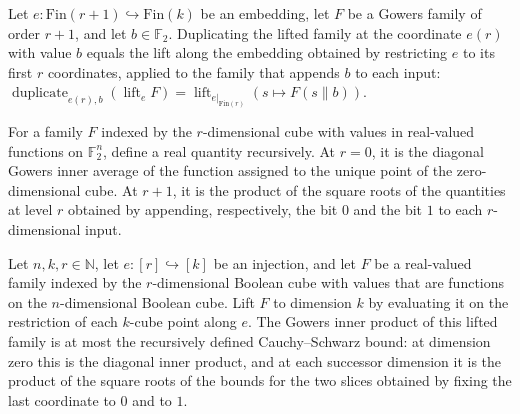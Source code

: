 \begin{theorem}
\label{FABL.gowersDuplicateAt_liftFamilyAlong}
\leanok
{}
Let $e:\mathrm{Fin}(r+1)\hookrightarrow\mathrm{Fin}(k)$ be an embedding, let $F$ be a
Gowers family of order $r+1$, and let $b\in\mathbb F_2$. Duplicating the lifted family
at the coordinate $e(r)$ with value $b$ equals the lift along the embedding obtained by
restricting $e$ to its first $r$ coordinates, applied to the family that appends $b$ to
each input: $\operatorname{duplicate}_{e(r),b}(\operatorname{lift}_e
F)=\operatorname{lift}_{e|_{\mathrm{Fin}(r)}}(s\mapsto F(s\mathbin{\|}b))$.
\end{theorem}

\begin{definition}
\label{FABL.gowersCSBound}
\leanok
{}
For a family $F$ indexed by the $r$-dimensional cube with values in real-valued
functions on $\mathbb F_2^n$, define a real quantity recursively. At $r=0$, it is the
diagonal Gowers inner average of the function assigned to the unique point of the
zero-dimensional cube. At $r+1$, it is the product of the square roots of the quantities
at level $r$ obtained by appending, respectively, the bit $0$ and the bit $1$ to each
$r$-dimensional input.
\end{definition}

\begin{theorem}
\label{FABL.gowersInner_liftFamilyAlong_le_csBound}
\leanok
{}
Let $n,k,r\in\mathbb N$, let $e:[r]\hookrightarrow[k]$ be an injection, and let $F$ be a
real-valued family indexed by the $r$-dimensional Boolean cube with values that are
functions on the $n$-dimensional Boolean cube. Lift $F$ to dimension $k$ by evaluating
it on the restriction of each $k$-cube point along $e$. The Gowers inner product of this
lifted family is at most the recursively defined Cauchy–Schwarz bound: at dimension zero
this is the diagonal inner product, and at each successor dimension it is the product of
the square roots of the bounds for the two slices obtained by fixing the last coordinate
to $0$ and to $1$.
\end{theorem}

